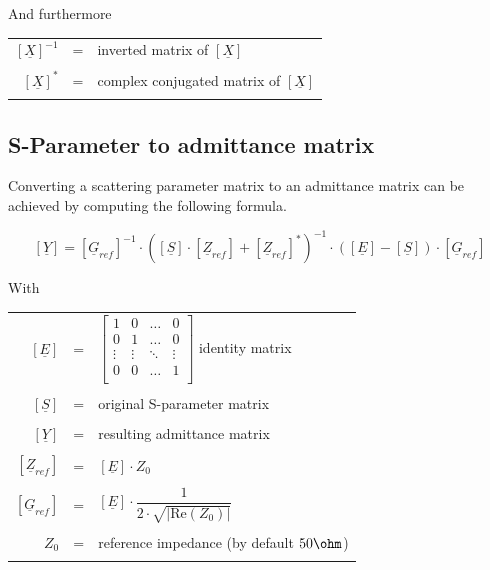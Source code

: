 \documentclass[10pt]{report}
\begin{document}
And furthermore

\addvspace{12pt}

\begin{tabular}{rll}
$\left[\underline{X}\right]^{-1}$ & = & 
inverted matrix of $\left[\underline{X}\right]$\\& &\\
$\left[\underline{X}\right]^{*}$ & = & 
complex conjugated matrix of $\left[\underline{X}\right]$\\& &\\
\end{tabular}

\subsection{S-Parameter to admittance matrix}

Converting a scattering parameter matrix to an admittance matrix can
be achieved by computing the following formula.

\begin{equation}
\left[
\underline{Y}
\right]
=
\left[
\underline{G}_{ref}
\right]^{-1}
\cdot
\left(
\left[\underline{S}\right] \cdot \left[\underline{Z}_{ref}\right] + \left[\underline{Z}_{ref}\right]^{*}
\right)^{-1}
\cdot
\left(
\left[\underline{E}\right] - \left[\underline{S}\right]
\right)
\cdot
\left[\underline{G}_{ref}\right]
\end{equation}

With

\addvspace{12pt}

\begin{tabular}{rll}
$\left[\underline{E}\right]$ & = &
$\begin{bmatrix}
1 & 0 & \ldots & 0\\
0 & 1 & \ldots & 0\\
\vdots & \vdots & \ddots & \vdots\\
0 & 0 & \ldots & 1\\
\end{bmatrix}$
identity matrix\\& &\\
$\left[\underline{S}\right]$ & = & original S-parameter matrix\\& &\\
$\left[\underline{Y}\right]$ & = & resulting admittance matrix\\& &\\
$\left[\underline{Z}_{ref}\right]$ & = &
$\left[\underline{E}\right] \cdot Z_{0}$\\& &\\
$\left[\underline{G}_{ref}\right]$ & = &
$\left[\underline{E}\right] \cdot 
\dfrac{1}{2\cdot \sqrt{\left| \text{Re}\left(Z_{0}\right)\right|}}$\\& &\\
$Z_{0}$ & = & reference impedance (by default $50\ohm$)\\& &\\
\end{tabular}
\end{document}
